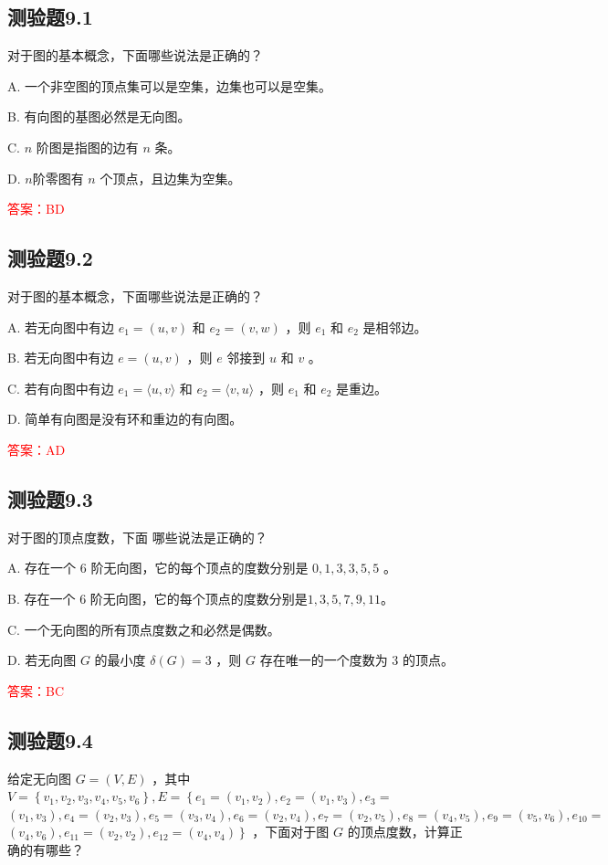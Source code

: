 \documentclass[UTF8, heading=true]{ctexart}
\begin{document}
\subsection{测验题9.1}

对于图的基本概念，下面哪些说法是正确的？

A. 一个非空图的顶点集可以是空集，边集也可以是空集。

B. 有向图的基图必然是无向图。

C. $n$ 阶图是指图的边有 $n$ 条。

D. $n$阶零图有 $n$ 个顶点，且边集为空集。

\textcolor{red}{答案：BD}

\subsection{测验题9.2}

对于图的基本概念，下面哪些说法是正确的？

A. 若无向图中有边 $e_1=(u, v)$ 和 $e_2=(v, w)$ ，则 $e_1$ 和 $e_2$ 是相邻边。

B. 若无向图中有边 $e=(u, v)$ ，则 $e$ 邻接到 $u$ 和 $v$ 。

C. 若有向图中有边 $e_1=\langle u, v\rangle$ 和 $e_2=\langle v, u\rangle$ ，则 $e_1$ 和 $e_2$ 是重边。

D. 简单有向图是没有环和重边的有向图。

\textcolor{red}{答案：AD}

\subsection{测验题9.3}

对于图的顶点度数，下面 哪些说法是正确的？

A. 存在一个 6 阶无向图，它的每个顶点的度数分别是 $0,1,3,3,5,5$ 。

B. 存在一个 6 阶无向图，它的每个顶点的度数分别是$1,3,5,7,9,11$。

C. 一个无向图的所有顶点度数之和必然是偶数。

D. 若无向图 $G$ 的最小度 $\delta(G)=3$ ，则 $G$ 存在唯一的一个度数为 3 的顶点。

\textcolor{red}{答案：BC}


\subsection{测验题9.4}

给定无向图 $G=(V, E)$ ，其中 $V=\left\{v_1, v_2, v_3, v_4, v_5, v_6\right\}, E=\left\{e_1=\left(v_1, v_2\right), e_2=\left(v_1, v_3\right), e_3=\right.$ $\left(v_1, v_3\right), e_4=\left(v_2, v_3\right), e_5=\left(v_3, v_4\right), e_6=\left(v_2, v_4\right), e_7=\left(v_2, v_5\right), e_8=\left(v_4, v_5\right), e_9=\left(v_5, v_6\right), e_{10}=$ $\left.\left(v_4, v_6\right), e_{11}=\left(v_2, v_2\right), e_{12}=\left(v_4, v_4\right)\right\}$ ，下面对于图 $G$ 的顶点度数，计算正确的有哪些？
\end{document}
